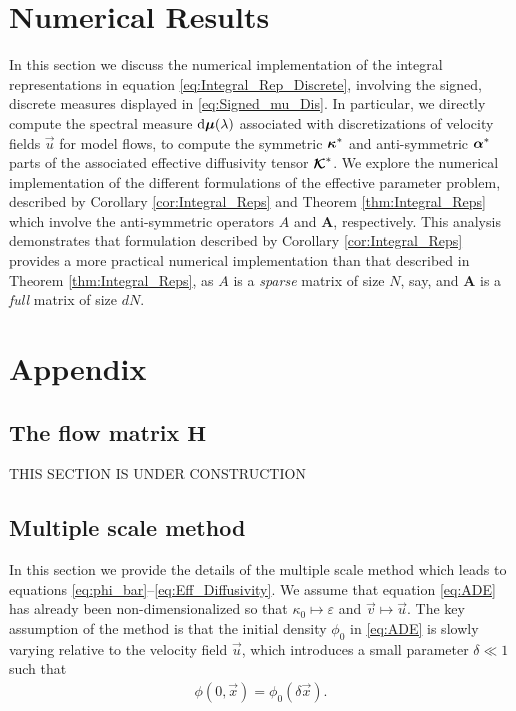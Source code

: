 \documentclass[11pt]{amsart}
\renewcommand{\d}{\mathrm{d}}
\newcommand{\Hb}{\mathbf{H}}
\newcommand{\Ab}{\mathbf{A}}
\newcommand\Kbc{\mbox{\boldmath${\mathcal{K}}$}}
\newcommand\bmu{\mbox{\boldmath${\mu}$}}
\newcommand\balpha{\mbox{\boldmath${\alpha}$}}
\newcommand\bkappa{\mbox{\boldmath${\kappa}$}}
\begin{document}
\section{Numerical Results}\label{sec:Num_Results}
%
In this section we discuss the numerical implementation of the
integral representations in equation \eqref{eq:Integral_Rep_Discrete},
involving the signed, discrete measures displayed in
\eqref{eq:Signed_mu_Dis}. In particular, we directly compute the
spectral measure $\d\bmu(\lambda)$ associated with discretizations of
velocity fields $\vec{u}$ for model flows, to compute the symmetric
$\bkappa^*$ and anti-symmetric $\balpha^*$ parts of the associated
effective diffusivity tensor $\Kbc^*$. We explore the numerical
implementation of the different formulations of the effective
parameter problem, described by Corollary \ref{cor:Integral_Reps} and
Theorem \ref{thm:Integral_Reps} which involve the anti-symmetric
operators $A$ and $\Ab$, respectively. This analysis demonstrates that
formulation described by Corollary \ref{cor:Integral_Reps} provides a
more practical numerical implementation than that described in Theorem
\ref{thm:Integral_Reps}, as $A$ is a \emph{sparse} matrix of size $N$,
say, and $\Ab$ is a \emph{full} matrix of size $dN$.    


  \setcounter{equation}{1}  %
  \setcounter{section}{0}  %
  \renewcommand{\theequation}{A-\arabic{equation}} 
\renewcommand{\thesection}{A-\arabic{section}}
%
\section{Appendix} 
\label{sec:Appendix}
%
\subsection{The flow matrix $\Hb$}\label{eq:flow_matrix}
%
THIS SECTION IS UNDER CONSTRUCTION
%
\subsection{Multiple scale method}\label{sec:Multiscal_Method}
%
In this section we provide the details of the multiple scale method
\cite{McLaughlin:SIAM_JAM:780,Papanicolaou:1981:36:8,Papanicolaou:RF-835,Bensoussan:Book:1978}
which leads to equations
\eqref{eq:phi_bar}--\eqref{eq:Eff_Diffusivity}. We assume that
equation \eqref{eq:ADE} has already been non-dimensionalized so that
$\kappa_0\mapsto\varepsilon$ and $\vec{v}\mapsto\vec{u}$. The key assumption of the method is
that the initial density $\phi_0$ in \eqref{eq:ADE} is slowly
varying relative to the velocity field $\vec{u}$, which introduces a
small parameter $\delta\ll1$ such that  
% 
\begin{align}\label{eq:IC}
  \phi(0,\vec{x})=\phi_0(\delta\vec{x}).
\end{align}
%
\end{document}
